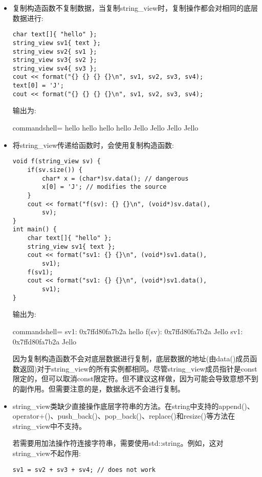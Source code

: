 \begin{itemize}
\item 
复制构造函数不复制数据，当复制string\_view时，复制操作都会对相同的底层数据进行:

\begin{lstlisting}[style=styleCXX]
char text[]{ "hello" };
string_view sv1{ text };
string_view sv2{ sv1 };
string_view sv3{ sv2 };
string_view sv4{ sv3 };
cout << format("{} {} {} {}\n", sv1, sv2, sv3, sv4);
text[0] = 'J';
cout << format("{} {} {} {}\n", sv1, sv2, sv3, sv4);
\end{lstlisting}

输出为:

\begin{tcblisting}{commandshell={}}
hello hello hello hello
Jello Jello Jello Jello
\end{tcblisting}

\item 
将string\_view传递给函数时，会使用复制构造函数:

\begin{lstlisting}[style=styleCXX]
void f(string_view sv) {
	if(sv.size()) {
		char* x = (char*)sv.data(); // dangerous
		x[0] = 'J'; // modifies the source
	}
	cout << format("f(sv): {} {}\n", (void*)sv.data(),
		sv);
}
int main() {
	char text[]{ "hello" };
	string_view sv1{ text };
	cout << format("sv1: {} {}\n", (void*)sv1.data(),
		sv1);
	f(sv1);
	cout << format("sv1: {} {}\n", (void*)sv1.data(),
		sv1);
}
\end{lstlisting}

输出为:

\begin{tcblisting}{commandshell={}}
sv1: 0x7ffd80fa7b2a hello
f(sv): 0x7ffd80fa7b2a Jello
sv1: 0x7ffd80fa7b2a Jello
\end{tcblisting}

因为复制构造函数不会对底层数据进行复制，底层数据的地址(由data()成员函数返回)对于string\_view的所有实例都相同。尽管string\_view成员指针是const限定的，但可以取消const限定符。但不建议这样做，因为可能会导致意想不到的副作用。但需要注意的是，数据永远不会进行复制。

\item 
string\_view类缺少直接操作底层字符串的方法。在string中支持的append()、operator+()、push\_back()、pop\_back()、replace()和resize()等方法在string\_view中不支持。

若需要用加法操作符连接字符串，需要使用std::string。例如，这对string\_view不起作用:

\begin{lstlisting}[style=styleCXX]
sv1 = sv2 + sv3 + sv4; // does not work
\end{lstlisting}


\end{itemize}
